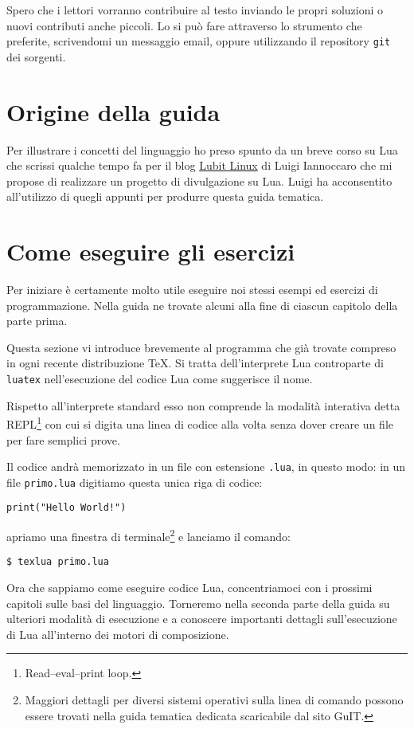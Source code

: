 Spero che i lettori vorranno contribuire al testo inviando le propri soluzioni o
nuovi contributi anche piccoli. Lo si può fare attraverso lo strumento che
preferite, scrivendomi un messaggio email, oppure utilizzando il repository
\texttt{git} dei sorgenti.


\section{Origine della guida}

Per illustrare i concetti del linguaggio ho preso spunto da un breve corso su
Lua che scrissi qualche tempo fa per il blog
\href{http://parliamodi-ubuntu.blogspot.it}{Lubit Linux} di Luigi Iannoccaro
che mi propose di realizzare un progetto di divulgazione su Lua. Luigi ha
acconsentito all'utilizzo di quegli appunti per produrre questa guida tematica.


\section{Come eseguire gli esercizi}

Per iniziare è certamente molto utile eseguire noi stessi esempi ed esercizi di
programmazione. Nella guida ne trovate alcuni alla fine di ciascun capitolo
della parte prima. 

Questa sezione vi introduce brevemente al programma  che già
trovate compreso in ogni recente distribuzione \TeX{}. Si tratta dell'interprete
Lua controparte di \texttt{luatex} nell'esecuzione del codice Lua come
suggerisce il nome.

Rispetto all'interprete  standard esso non comprende la modalità
interativa detta REPL\footnote{Read–eval–print loop.} con cui si digita una
linea di codice alla volta senza dover creare un file per fare semplici prove. 

Il codice andrà memorizzato in un file con estensione \texttt{.lua}, in questo
modo: in un file \texttt{primo.lua} digitiamo questa unica riga di codice:
\begin{Verbatim}
print("Hello World!")
\end{Verbatim}
apriamo una finestra di terminale\footnote{Maggiori dettagli per diversi sistemi
operativi sulla linea di comando possono essere trovati nella guida tematica
dedicata scaricabile dal sito GuIT.} e lanciamo il comando:
\begin{Verbatim}
$ texlua primo.lua
\end{Verbatim}

Ora che sappiamo come eseguire codice Lua, concentriamoci con i prossimi
capitoli sulle basi del linguaggio. Torneremo nella seconda parte della guida su
ulteriori modalità di esecuzione e a conoscere importanti dettagli
sull'esecuzione di Lua all'interno dei motori di composizione.


